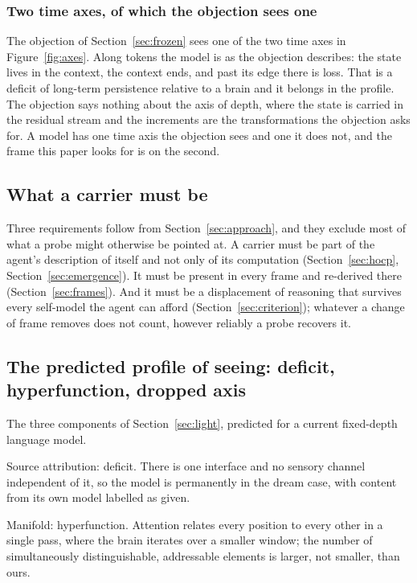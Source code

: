 \subsubsection{Two time axes, of which the objection sees one}
\label{sec:twoaxes}

The objection of Section~\ref{sec:frozen} sees one of the two time axes in Figure~\ref{fig:axes}. Along tokens the model is as the objection
describes: the state lives in the context, the context ends, and past its edge there is loss. That is a
deficit of long-term persistence relative to a brain and it belongs in the profile. The objection says
nothing about the axis of depth, where the state is carried in the residual stream and the increments are
the transformations the objection asks for. A model has one time axis the objection sees and one it does
not, and the frame this paper looks for is on the second.

\subsection{What a carrier must be}

Three requirements follow from Section~\ref{sec:approach}, and they exclude most of what a probe might
otherwise be pointed at. A carrier must be part of the agent's description of itself and not only of its
computation (Section~\ref{sec:hocp}, Section~\ref{sec:emergence}). It must be present in every frame and
re-derived there (Section~\ref{sec:frames}). And it must be a displacement of reasoning that survives
every self-model the agent can afford (Section~\ref{sec:criterion}); whatever a change of frame removes
does not count, however reliably a probe recovers it.

\subsection{The predicted profile of seeing: deficit, hyperfunction, dropped axis}
\label{sec:profile-seeing}

The three components of Section~\ref{sec:light}, predicted for a current fixed-depth language model.

Source attribution: deficit. There is one interface and no sensory channel independent of it, so the
model is permanently in the dream case, with content from its own model labelled as given.

Manifold: hyperfunction. Attention relates every position to every other in a single pass, where the
brain iterates over a smaller window; the number of simultaneously distinguishable, addressable elements
is larger, not smaller, than ours.

